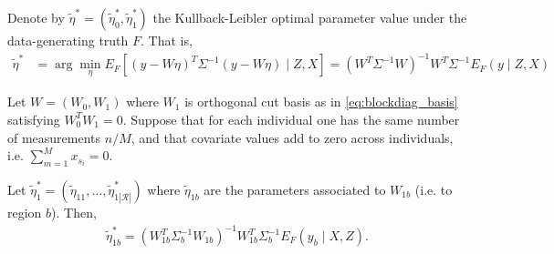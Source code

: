 Denote by $\widetilde{\eta}^*=(\widetilde{\eta}_0^*,\widetilde{\eta}_1^*)$ the Kullback-Leibler optimal parameter value under the data-generating truth $F$. That is,
\begin{align}
 \widetilde{\eta}^*&= \arg\min_\eta E_F \left[ (y - W\eta)^T \Sigma^{-1} (y - W\eta) \mid Z,X \right]=
(W^T \Sigma^{-1} W)^{-1} W^T \Sigma^{-1} E_F(y \mid Z,X)
\nonumber
\end{align}


\begin{lemma}
Let $W=(W_0,W_1)$ where $W_1$ is orthogonal cut basis as in \eqref{eq:blockdiag_basis} satisfying $W_0^T W_1=0$.
Suppose that for each individual one has the same number of measurements $n/M$,
and that covariate values add to zero across individuals, i.e. $\sum_{m=1}^M x_{s_i} = 0$.

Let $\widetilde{\eta}_1^*= (\widetilde{\eta}_{11},\ldots,\widetilde{\eta}_{1|\mathcal{R}|}^*)$ where $\widetilde{\eta}_{1b}$ are the parameters associated to $W_{1b}$ (i.e. to region $b$).
Then, 
\begin{align}
 \widetilde{\eta}_{1b}^*= (W_{1b}^T \Sigma_b^{-1} W_{1b})^{-1} W_{1b}^T \Sigma_b^{-1} E_F(y_b \mid X,Z).
\nonumber
\end{align}

\label{lem:zero_depmodel}
\end{lemma}


